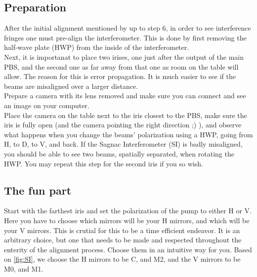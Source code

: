 \subsection{Preparation}
After the initial alignment mentioned by \cite{deny_hamel} up to step 6, in order to see interference fringes one must pre-align the interferometer. This is done by first removing the half-wave plate (HWP)
from the inside of the interferometer.\\
Next, it is importanat to place two irises, one just after the output of the main PBS, and the second one as far away from that one as room on the table will allow.
The reason for this is error propagation. It is much easier to see if the beams are misaligned over a larger distance.\\
Prepare a camera with its lens removed and make sure you can connect and see an image on your computer.\\
Place the camera on the table next to the iris closest to the PBS, make sure the iris is fully open (and the camera pointing the right direction ;) ),
and observe what happens when you change the beams' polarization using a HWP, going from H, to D, to V, and back. If the Sagnac Interferometer (SI) is badly misaligned,
you should be able to see two beams, spatially separated, when rotating the HWP. You may repeat this step for the second iris if you so wish.\\
\subsection{The fun part}
Start with the farthest iris and set the polarization of the pump to either H or V. Here you have to choose which mirrors will be your H mirrors, and which will be your V mirrors.
This is crutial for this to be a time efficient endeavor. It is an arbitrary choice, but one that needs to be made and respected throughout the enterity of the alignment process.
Choose them in an intuitive way for you. Based on \ref{fig:SI}, we choose the H mirrors to be C, and M2, and the V mirrors to be M0, and M1.

